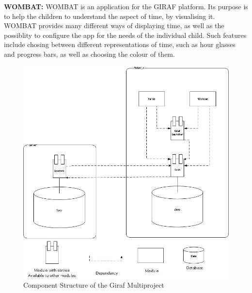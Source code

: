 \textbf{WOMBAT:} WOMBAT is an application for the GIRAF platform. Its purpose is to help the children to understand the aspect of time, by visualising it. WOMBAT provides many different ways of displaying time, as well as the possiblity to configure the app for the needs of the individual child. Such features include chosing between different representations of time, such as hour glasses and progress bars, as well as choosing the colour of them.\newline

\begin{figure}
	\centering
		\includegraphics[scale=0.8]{images/Giraf_comp_pic.jpg}
	\caption{Component Structure of the Giraf Multiproject}
	\label{fig:Giraf_comp_pic}
\end{figure}
